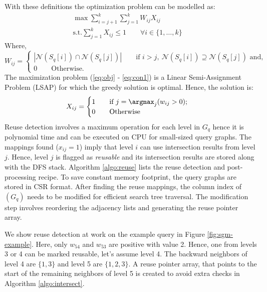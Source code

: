 With these definitions the optimization problem can be modelled as:
\begin{align}
    \max \sum_{i=j+1}^{k}\sum_{j=1}^{k} W_{ij} X_{ij} \label{eq:obj} \qquad \qquad \\
    \text{s.t.}
    \sum_{j=1}^k X_{ij} \leq 1 \qquad \forall i \in \{1, \dots, k\} \label{eq:con1}
\end{align}
Where, $$
    W_{ij} = \begin{cases}
        |\mathcal{N}(S_q[i]) \cap \mathcal{N}(S_q[j])| \qquad \text{if } i>j,~\mathcal{N}(S_q[i]) \supseteq \mathcal{N}(S_q[j])  \text{ and,}\\
        0   \qquad \text{Otherwise.}
    \end{cases}
$$
The maximization problem (\ref{eq:obj} - \ref{eq:con1}) is a Linear Semi-Assignment Problem (LSAP) for which the greedy solution is optimal.
Hence, the solution is:
$$
    X_{ij}=\begin{cases}
        1   \qquad \text{if } j=\argmax_j(w_{ij}>0); \\
        0   \qquad \text{Otherwise}
    \end{cases}
$$
Reuse detection involves a maximum operation for each level in $G_q$ hence it is polynomial time and can be executed on CPU for small-sized query graphs.
The mappings found ($x_{ij} = 1$) imply that level $i$ can use intersection results from level $j$.
Hence, level $j$ is flagged as \textit{reusable} and its intersection results are stored along with the DFS stack.
Algorithm \ref{algo:reuse} lists the reuse detection and post-processing recipe.
To save constant memory footprint, the query graphs are stored in CSR format.
After finding the reuse mappings, the column index of $(G_q)$ needs to be modified for efficient search tree traversal.
The modification step involves reordering the adjacency lists and generating the reuse pointer array.

We show reuse detection at work on the example query in Figure \ref{fig:sgm-example}.
Here, only $w_{54}$ and $w_{53}$ are positive with value 2. Hence, one from levels 3 or 4 can be marked reusable, let's assume level 4.
The backward neighbors of level 4 are $\{1,3\}$ and level 5 are $\{1,2,3\}$.
A reuse pointer array, that points to the start of the remaining neighbors of level 5 is created to avoid extra checks in Algorithm \ref{algo:intersect}.

